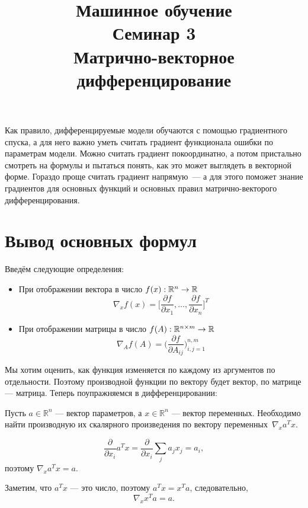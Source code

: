 \documentclass[12pt,fleqn]{article}
\begin{document}
\title{Машинное обучение\\Семинар 3\\Матрично-векторное дифференцирование}
\author{}
\date{}
\maketitle

Как правило, дифференцируемые модели обучаются с помощью градиентного спуска,
а для него важно уметь считать градиент функционала ошибки по параметрам модели.
Можно считать градиент покоординатно, а потом пристально смотреть на формулы и
пытаться понять, как это может выглядеть в векторной форме.
Гораздо проще считать градиент напрямую~--- а для этого поможет знание градиентов
для основных функций и основных правил матрично-векторого дифференцирования.

\section{Вывод основных формул}

Введём следующие определения:
\begin{itemize}
    \item При отображении вектора в число $f(x): \mathbb{R}^n \to \mathbb{R}$ 
    \[
        \nabla_x f(x)
        =
        \bigg[
            \frac{\partial f}{\partial x_1},
            \dots,
            \frac{\partial f}{\partial x_n}
        \bigg]^T
    \]

    \item При отображении матрицы в число $f(A): \RR^{n \times m} \to \RR$
    \[
        \nabla_A f(A)
        =
        \bigg(
            \frac{\partial f}{\partial A_{ij}}
        \bigg)_{i,j=1}^{n,m}
    \]

\end{itemize}

Мы хотим оценить, как функция изменяется по каждому из аргументов по отдельности. Поэтому производной функции по вектору будет вектор, по матрице --- матрица. Теперь поупражняемся в дифференцировании:

\begin{vkProblem} Пусть $a \in \mathbb{R}^n$ --- вектор параметров, а $x \in \mathbb{R}^n$ --- вектор переменных. Необходимо найти производную их скалярного произведения по вектору переменных~$\nabla_x a^Tx$. 
\end{vkProblem}

\begin{esSolution}
\[
    \frac{\partial}{\partial x_i} a^Tx = \frac{\partial}{\partial x_i}\sum_j a_jx_j = a_i,
\]поэтому $\nabla_x a^Tx = a. $

    Заметим, что $a^Tx$ — это число, поэтому $a^Tx = x^Ta$, следовательно, 
    \[\nabla_x x^Ta = a.\]
\end{esSolution}
\end{document}
